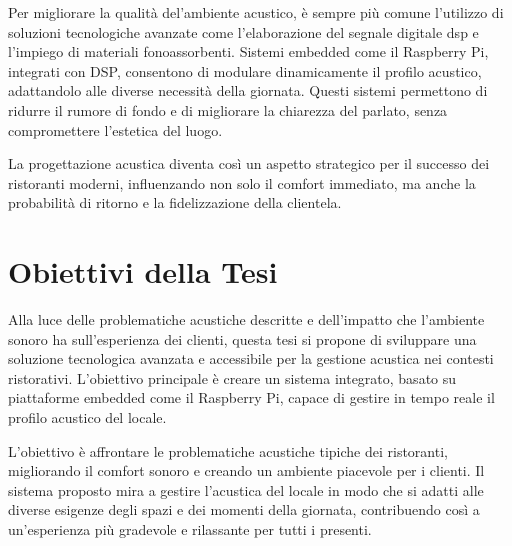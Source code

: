 Per migliorare la qualità del'ambiente acustico, è sempre più comune l'utilizzo di soluzioni tecnologiche avanzate come l'elaborazione del segnale digitale \gls{dsp} e l'impiego di materiali fonoassorbenti. Sistemi embedded come il Raspberry Pi, integrati con DSP, consentono di modulare dinamicamente il profilo acustico, adattandolo alle diverse necessità della giornata. Questi sistemi permettono di ridurre il rumore di fondo e di migliorare la chiarezza del parlato, senza compromettere l'estetica del luogo. 

La progettazione acustica diventa così un aspetto strategico per il successo dei ristoranti moderni, influenzando non solo il comfort immediato, ma anche la probabilità di ritorno e la fidelizzazione della clientela.

\section{Obiettivi della Tesi}
\noindent

Alla luce delle problematiche acustiche descritte e dell'impatto che l'ambiente sonoro ha sull'esperienza dei clienti, questa tesi si propone di sviluppare una soluzione tecnologica avanzata e accessibile per la gestione acustica nei contesti ristorativi. L'obiettivo principale è creare un sistema integrato, basato su piattaforme embedded come il Raspberry Pi, capace di gestire in tempo reale il profilo acustico del locale.

L'obiettivo è affrontare le problematiche acustiche tipiche dei ristoranti, migliorando il comfort sonoro e creando un ambiente piacevole per i clienti. Il sistema proposto mira a gestire l'acustica del locale in modo che si adatti alle diverse esigenze degli spazi e dei momenti della giornata, contribuendo così a un'esperienza più gradevole e rilassante per tutti i presenti.